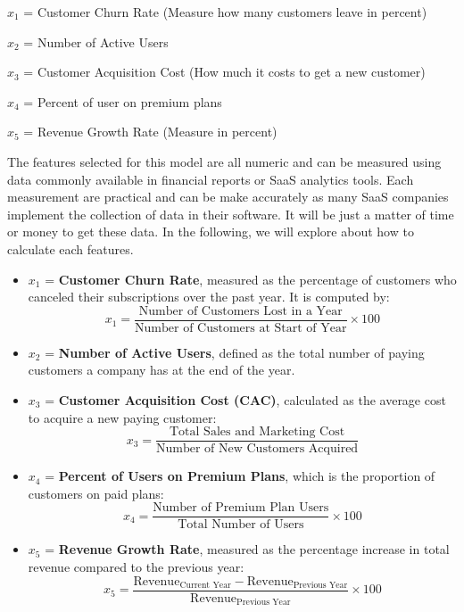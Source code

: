\documentclass[12pt]{article}
\begin{document}
$x_1$ = Customer Churn Rate (Measure how many customers leave in percent)

$x_2$ = Number of Active Users

$x_3$ = Customer Acquisition Cost (How much it costs to get a new customer)

$x_4$ = Percent of user on premium plans

$x_5$ = Revenue Growth Rate (Measure in percent)


The features selected for this model are all numeric and can be measured using data commonly available in financial reports or SaaS analytics tools. Each measurement are practical and can be make accurately as many SaaS companies implement the collection of data in their software. It will be just a matter of time or money to get these data. In the following, we will explore about how to calculate each features.

\begin{itemize}

    \item $x_1$ = \textbf{Customer Churn Rate}, measured as the percentage of customers who canceled their subscriptions over the past year. It is computed by:
    \[
    x_1 = \frac{\text{Number of Customers Lost in a Year}}{\text{Number of Customers at Start of Year}} \times 100
    \]
    
    \item $x_2$ = \textbf{Number of Active Users}, defined as the total number of paying customers a company has at the end of the year.
    
    \item $x_3$ = \textbf{Customer Acquisition Cost (CAC)}, calculated as the average cost to acquire a new paying customer:
    \[
    x_3 = \frac{\text{Total Sales and Marketing Cost}}{\text{Number of New Customers Acquired}}
    \]
    
    \item $x_4$ = \textbf{Percent of Users on Premium Plans}, which is the proportion of customers on paid plans:
    \[
    x_4 = \frac{\text{Number of Premium Plan Users}}{\text{Total Number of Users}} \times 100
    \]
    
    \item $x_5$ = \textbf{Revenue Growth Rate}, measured as the percentage increase in total revenue compared to the previous year:
    \[
    x_5 = \frac{\text{Revenue}_{\text{Current Year}} - \text{Revenue}_{\text{Previous Year}}}{\text{Revenue}_{\text{Previous Year}}} \times 100
    \]
\end{itemize}
\end{document}
